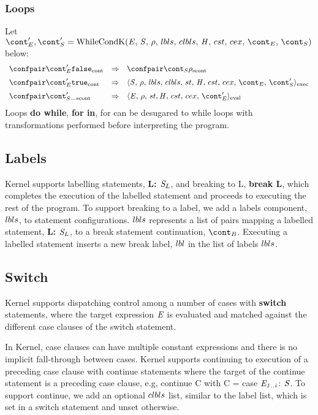 \documentclass{article}
\begin{document}
\subsubsection{Loops}
Let $\econt', \scont' = \whilecondk$ below:
\[
  \begin{array}{lcl}
	\contconf{\econt'}{\false}
	& \Rightarrow &
	\scontconf{\scont}{\env}\\[2mm]

	\contconf{\econt'}{\true}
	& \Rightarrow &
	\execconf{\stmt}{\env}{\lbls}{\clbls}{\handler}{\cstrace}{\cex}{\econt}{\scont'}\\[2mm]

	\scontconf{\scont'}{\_}
	& \Rightarrow &
	\evalconf{\expr}{\env}{\strace}{\cstrace}{\cex}{\econt'}\\
  \end{array}
\]
Loops \textbf{do while}, \textbf{for in}, for can be desugared to while loops with transformations performed before interpreting the program.

\subsection{Labels}

Kernel supports labelling statements, \textbf{L: $\mathit{S}_{L}$}, and breaking to L, \textbf{break L}, which completes the execution of the labelled statement and proceeds to executing the rest of the program.
To support breaking to a label, we add a labels component, $lbls$, to statement configurations.
$lbls$ represents a list of pairs mapping a labelled statement, \textbf{L: $\mathit{S}_L$}, to a break statement continuation, $\bcont$.
Executing a labelled statement inserts a new break label, $lbl$ in the list of labels $lbls$.

\subsection{Switch}
Kernel supports dispatching control among a number of cases with \textbf{switch} statements, where the target expression $\mathit{E}$ is evaluated and matched against the different case clauses of the switch statement.

In Kernel, case clauses can have multiple constant expressions and there is no implicit fall-through between cases.
Kernel supports continuing to execution of a preceding case clause with continue statements where the target of the continue statement is a preceding case clause, e.g, continue C with C = case $\mathit{E}_\mathit{1..i}$: $\mathit{S}$.
To support continue, we add an optional $clbls$ list, similar to the label list, which is set in a switch statement and unset otherwise.
\end{document}
